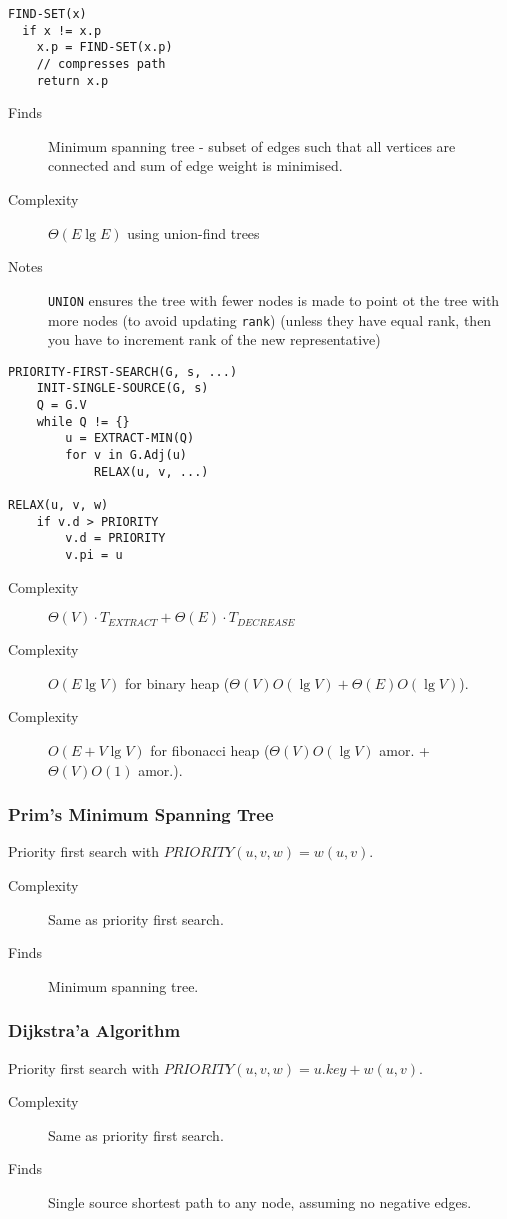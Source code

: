 \documentclass[10pt, a4paper,landscape]{article}
\begin{document}
\begin{multicols*}{4}
\begin{lstlisting}
FIND-SET(x)
  if x != x.p
    x.p = FIND-SET(x.p) 
    // compresses path
    return x.p
\end{lstlisting}
\begin{description}
    \item[Finds] Minimum spanning tree - subset of edges such that all vertices are connected and sum of edge weight is minimised.
    \item[Complexity] $\Theta(E\lg{E})$ using union-find trees
    \item[Notes] \texttt{UNION} ensures the tree with fewer nodes is made to point ot the tree with more nodes (to avoid updating \texttt{rank}) (unless they have equal rank, then you have to increment rank of the new representative)
\end{description}

\begin{lstlisting}
PRIORITY-FIRST-SEARCH(G, s, ...)
    INIT-SINGLE-SOURCE(G, s)
    Q = G.V
    while Q != {}
        u = EXTRACT-MIN(Q)
        for v in G.Adj(u)
            RELAX(u, v, ...)

RELAX(u, v, w)
    if v.d > PRIORITY
        v.d = PRIORITY
        v.pi = u
\end{lstlisting}
\begin{description}
    \item[Complexity] $\Theta(V)\cdot T_{EXTRACT} + \Theta(E)\cdot T_{DECREASE}$
    \item[Complexity] $O(E\lg{V})$ for binary heap ($\Theta(V) O(\lg V) + \Theta(E) O(\lg V)$).
    \item[Complexity] $O(E + V\lg{V})$ for fibonacci heap ($\Theta(V) O(\lg V)$ amor. + $\Theta(V) O(1)$ amor.).
\end{description}

\subsubsection{Prim's Minimum Spanning Tree}
Priority first search with $PRIORITY(u, v, w) = w(u, v)$.
\begin{description}
    \item[Complexity] Same as priority first search.
    \item[Finds] Minimum spanning tree.
\end{description}

\subsubsection{Dijkstra'a Algorithm}
Priority first search with $PRIORITY(u, v, w) = u.key + w(u, v)$.
\begin{description}
    \item[Complexity] Same as priority first search.
    \item[Finds] Single source shortest path to any node, assuming no negative edges.
\end{description}


\end{multicols*}
\end{document}
